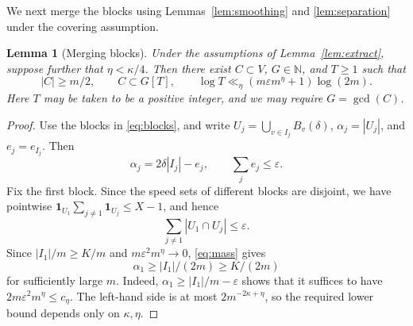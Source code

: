 \documentclass[12pt,leqno]{article}
\numberwithin{equation}{section}
\newtheorem{lemma}[theorem]{Lemma}
\theoremstyle{remark}
\newcommand{\LRnatural}{\mathbb N}
\newcommand{\LRindicator}{\mathbf 1}
\begin{document}
We next merge the blocks using Lemmas~\ref{lem:smoothing} and \ref{lem:separation} under the covering assumption.

\begin{lemma}[Merging blocks]\label{lem:merge}
Under the assumptions of Lemma~\ref{lem:extract}, suppose further that $\eta<\kappa/4$. Then there exist $C\subset V$, $G\in\LRnatural$, and $T\ge1$ such that
\begin{equation}\label{eq:core}
|C|\ge m/2,\qquad C\subset G[T],\qquad
\log T\ll_\eta (m\varepsilon m^\eta+1)\log(2m).
\end{equation}
Here $T$ may be taken to be a positive integer, and we may require $G=\gcd(C)$.
\end{lemma}
\begin{proof}
Use the blocks in \eqref{eq:blocks}, and write $U_j=\bigcup_{v\in I_j}B_v(\delta)$, $\alpha_j=|U_j|$, and $e_j=e_{I_j}$. Then
\begin{equation}\label{eq:mass}
\alpha_j=2\delta|I_j|-e_j,\qquad \sum_je_j\le\varepsilon.
\end{equation}
Fix the first block. Since the speed sets of different blocks are disjoint, we have pointwise
$\LRindicator_{U_1}\sum_{j\ne1}\LRindicator_{U_j}\le X-1$, and hence
\begin{equation}\label{eq:cross}
\sum_{j\ne1}|U_1\cap U_j|\le\varepsilon.
\end{equation}
Since $|I_1|/m\ge K/m$ and $m\varepsilon^2m^\eta\to0$, \eqref{eq:mass} gives
\begin{equation}\label{eq:pivotmass}
\alpha_1\ge |I_1|/(2m)\ge K/(2m)
\end{equation}
for sufficiently large $m$. Indeed, $\alpha_1\ge|I_1|/m-\varepsilon$ shows that it suffices to have $2m\varepsilon^2m^\eta\le c_\eta$. The left-hand side is at most $2m^{-2\kappa+\eta}$, so the required lower bound depends only on $\kappa,\eta$.


\end{proof}
\end{document}

